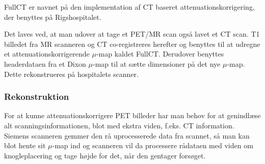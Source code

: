 FullCT er navnet på den implementation af CT baseret
attenuationskorrigering, der benyttes på Rigshospitalet.

Det laves ved, at man udover at tage et PET/MR scan også lavet et CT
scan. T1 billedet fra MR scanneren og CT co-registreres herefter og
benyttes til at udregne et attenuationskorrigerende $\mu$-map kaldet
FullCT. Derudover benyttes headerdataen fra et Dixon $\mu$-map til
at sætte dimensioner på det nye $\mu$-map. Dette rekonstrueres på
hospitalets scanner.

\subsubsection{Rekonstruktion}

For at kunne attenuationskorrigere PET billeder har man behov for at
genindlæse alt scanningsinformationen, blot med ekstra viden, f.eks.
CT information. Siemens scanneren gemmer den rå uprocesserede data fra
scannet, så man kan blot hente sit $\mu$-map ind og scanneren vil da
processere rådataen med viden om knogleplacering og tage højde for det,
når den gentager forsøget.

